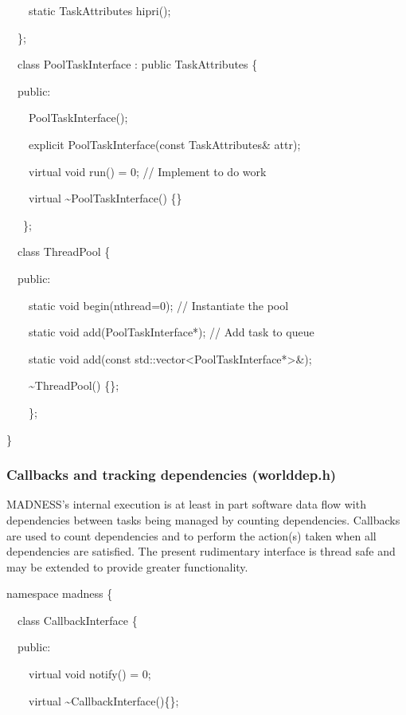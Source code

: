 \documentclass[letterpaper]{article}
\begin{document}
{\ttfamily
\ \ \ \ static TaskAttributes hipri();}

{\ttfamily
\ \ \};}


\bigskip

{\ttfamily
\ \ class PoolTaskInterface : public TaskAttributes \{}

{\ttfamily
\ \ public:}

{\ttfamily
\ \ \ \ PoolTaskInterface();}

{\ttfamily
\ \ \ \ explicit PoolTaskInterface(const TaskAttributes\& attr);}

{\ttfamily
\ \ \ \ virtual void run() = 0; // Implement to do work}

{\ttfamily
\ \ \ \ virtual \~{}PoolTaskInterface() \{\}}

{\ttfamily
\ \ \ \};}


\bigskip

{\ttfamily
\ \ class ThreadPool \{}

{\ttfamily
\ \ public:}

{\ttfamily
\ \ \ \ static void begin(nthread=0); // Instantiate the pool}

{\ttfamily
\ \ \ \ static void add(PoolTaskInterface*); // Add task to queue}

{\ttfamily
\ \ \ \ static void add(const std::vector{\textless}PoolTaskInterface*{\textgreater}\&);}

{\ttfamily
\ \ \ \ \~{}ThreadPool() \{\};}

{\ttfamily
\ \ \ \ \};}

{\ttfamily
\}}

\subsubsection{Callbacks and tracking dependencies (worlddep.h)}
MADNESS's internal execution is at least in part software data flow with dependencies between tasks being managed by
counting dependencies. Callbacks are used to count dependencies and to perform the action(s) taken when all
dependencies are satisfied. The present rudimentary interface is thread safe and may be extended to provide greater
functionality.

{\ttfamily
namespace madness \{}

{\ttfamily
\ \ class CallbackInterface \{}

{\ttfamily
\ \ public:}

{\ttfamily
\ \ \ \ virtual void notify() = 0;}

{\ttfamily
\ \ \ \ virtual \~{}CallbackInterface()\{\};}
\end{document}
